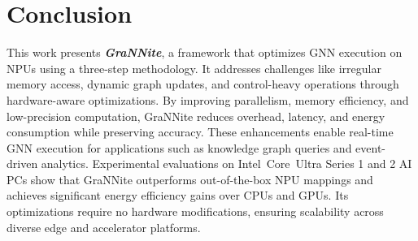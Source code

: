 \section{Conclusion}\label{sec:conclusion}
This work presents \textbf{\textit{GraNNite}}, a framework that optimizes GNN execution on NPUs using a three-step methodology. It addresses challenges like irregular memory access, dynamic graph updates, and control-heavy operations through hardware-aware optimizations. By improving parallelism, memory efficiency, and low-precision computation, GraNNite reduces overhead, latency, and energy consumption while preserving accuracy. These enhancements enable real-time GNN execution for applications such as knowledge graph queries and event-driven analytics. Experimental evaluations on Intel\textregistered\ Core\texttrademark\ Ultra Series 1 and 2 AI PCs show that GraNNite outperforms out-of-the-box NPU mappings and achieves significant energy efficiency gains over CPUs and GPUs. Its optimizations require no hardware modifications, ensuring scalability across diverse edge and accelerator platforms.
